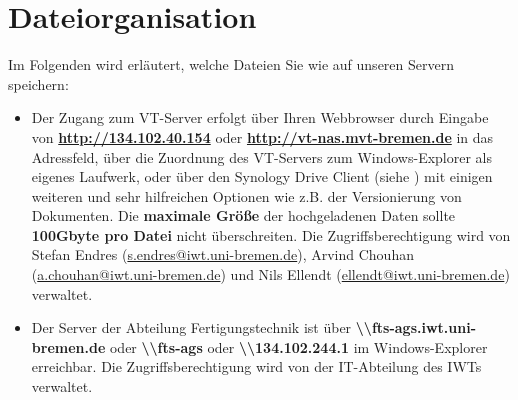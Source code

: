 \section{Dateiorganisation}\label{ssc:Dateiorganisation}
Im Folgenden wird erläutert, welche Dateien Sie wie auf unseren Servern
speichern:
\begin{itemize}
  \item Der Zugang zum VT-Server erfolgt über Ihren Webbrowser durch Eingabe von
        \textbf{\url{http://134.102.40.154}} oder
        \textbf{\url{http://vt-nas.mvt-bremen.de}}
        in das Adressfeld, über die Zuordnung des VT-Servers zum
        Windows-Explorer als eigenes Laufwerk, oder über den Synology Drive
        Client (siehe \cite{synology2022}) mit einigen weiteren und sehr
        hilfreichen Optionen wie z.B. der Versionierung von Dokumenten.
        Die \textbf{maximale Größe} der hochgeladenen Daten sollte
        \textbf{100Gbyte pro Datei} nicht überschreiten. Die
        Zugriffsberechtigung wird von
        Stefan Endres (\href{mailto:s.endres@iwt.uni-bremen.de}%
                       {s.endres@iwt.uni-bremen.de}),
        Arvind Chouhan (\href{mailto:a.chouhan@iwt.uni-bremen.de}%
                        {a.chouhan@iwt.uni-bremen.de})
        und Nils Ellendt (\href{mailto:ellendt@iwt.uni-bremen.de}%
                          {ellendt@iwt.uni-bremen.de})
        verwaltet.
  \item Der Server der Abteilung Fertigungstechnik ist über
        \textbf{\textbackslash\textbackslash fts-ags.iwt.uni-bremen.de}
        oder \textbf{\textbackslash\textbackslash fts-ags}
        oder \textbf{\textbackslash\textbackslash 134.102.244.1} im
        Windows-Explorer erreichbar. Die Zugriffsberechtigung wird von der
        IT-Abteilung des IWTs verwaltet.
\end{itemize}

